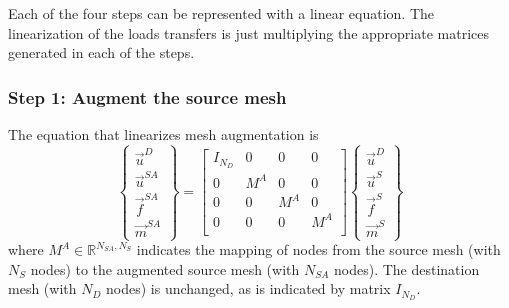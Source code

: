\documentclass[10pt,letterpaper,oneside,notitlepage]{article}
\begin{document}
Each of the four steps can be represented with a linear equation. The linearization of the loads transfers is just multiplying the 
appropriate matrices generated in each of the steps.


\subsubsection{Step 1: Augment the source mesh}
The equation that linearizes mesh augmentation is
\begin{equation}
\label{Augment}
   \left\{   \begin{matrix} \vec{u}^D \\ \vec{u}^{SA} \\ \vec{f}^{SA} \\ \vec{m}^{SA} \end{matrix} \right\} 
=
   \begin{bmatrix}
   I_{\mathit{N_D}} & 0   & 0   & 0   \\
   0                      & M^A & 0   & 0   \\
   0                      & 0   & M^A & 0   \\
   0                      & 0   & 0   & M^A \\
   \end{bmatrix}
   \left\{   \begin{matrix} \vec{u}^D \\ \vec{u}^S \\ \vec{f}^S \\ \vec{m}^S \end{matrix} \right\} 
\end{equation}
where $M^A \in \mathbb{R}^{ \mathit{N_{SA}},\mathit{N_{S}}}$ indicates the mapping of nodes from the source mesh (with $N_S$ nodes) to the augmented source mesh
(with $N_{SA}$ nodes). The destination mesh (with $N_D$ nodes) is unchanged, as is indicated by matrix $I_{\mathit{N_D}}$.
\end{document}
